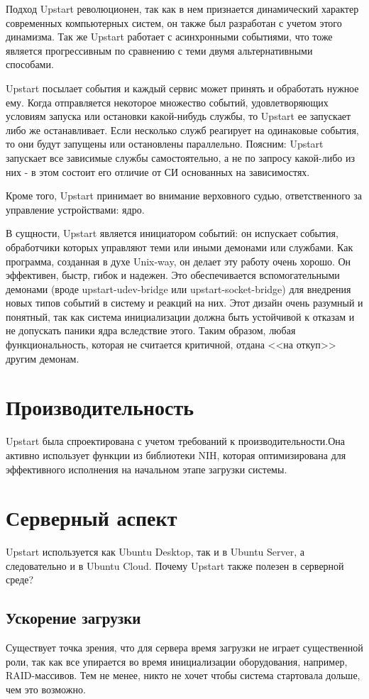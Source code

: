 Подход Upstart революционен, так как в нем признается динамический характер современных компьютерных систем, он также был разработан с учетом этого динамизма. Так же Upstart работает с асинхронными событиями, что тоже является прогрессивным по сравнению с теми двумя альтернативными способами.

Upstart посылает события и каждый сервис может принять и обработать нужное ему. Когда отправляется некоторое множество событий, удовлетворяющих условиям запуска или остановки какой-нибудь службы, то Upstart ее запускает либо же останавливает. Если несколько служб реагирует на одинаковые события, то они будут запущены или остановлены параллельно. Поясним: Upstart запускает все зависимые службы самостоятельно, а не по запросу какой-либо из них - в этом состоит его отличие от СИ основанных на зависимостях.

Кроме того, Upstart принимает во внимание верховного судью, ответственного за управление устройствами: ядро.

В сущности, Upstart является инициатором событий: он испускает события, обработчики которых управляют теми или иными демонами или службами. Как программа, созданная в духе Unix-way, он делает эту работу очень хорошо. Он эффективен, быстр, гибок и надежен. Это обеспечивается вспомогательными демонами (вроде upstart-udev-bridge или upstart-socket-bridge) для внедрения новых типов событий в систему и реакций на них. Этот дизайн очень разумный и понятный, так как система инициализации должна быть устойчивой к отказам и не допускать паники ядра вследствие этого. Таким образом, любая функциональность, которая не считается критичной, отдана <<на откуп>> другим демонам.
\section{Производительность}
Upstart была спроектирована с учетом требований к производительности.Она активно использует функции из библиотеки NIH, которая оптимизирована для эффективного исполнения на начальном этапе загрузки системы. 
\section{Серверный аспект} 
Upstart используется как Ubuntu Desktop, так и в Ubuntu Server, а следовательно и в Ubuntu Cloud. Почему Upstart также полезен в серверной среде?
\subsection{Ускорение загрузки}
Существует точка зрения, что для сервера время загрузки не играет существенной роли, так как все упирается во время инициализации оборудования, например, RAID-массивов. Тем не менее, никто не хочет чтобы система стартовала дольше, чем это возможно.

